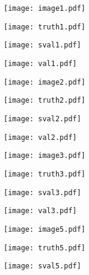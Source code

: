 \documentclass[journal]{IEEEtran}
\begin{document}
\begin{figure*}
\centering
\begin{minipage}{1.6in}
\texttt{[image: image1.pdf]}
\end{minipage}
\begin{minipage}{1.6in}
\texttt{[image: truth1.pdf]}
\end{minipage}
\begin{minipage}{1.6in}
\texttt{[image: sval1.pdf]}
\end{minipage}
\vspace{0.3em}
\begin{minipage}{1.6in}
\texttt{[image: val1.pdf]}
\end{minipage}
\vspace{0.3em}
\begin{minipage}{1.6in}
\texttt{[image: image2.pdf]}
\end{minipage}
\begin{minipage}{1.6in}
\texttt{[image: truth2.pdf]}
\end{minipage}
\begin{minipage}{1.6in}
\texttt{[image: sval2.pdf]}
\end{minipage}
\begin{minipage}{1.6in}
\texttt{[image: val2.pdf]}
\end{minipage}
\vspace{0.3em}
\begin{minipage}{1.6in}
\texttt{[image: image3.pdf]}
\end{minipage}
\begin{minipage}{1.6in}
\texttt{[image: truth3.pdf]}
\end{minipage}
\begin{minipage}{1.6in}
\texttt{[image: sval3.pdf]}
\end{minipage}
\begin{minipage}{1.6in}
\texttt{[image: val3.pdf]}
\end{minipage}
\vspace{0.3em}
\begin{minipage}{1.6in}
\texttt{[image: image5.pdf]}
\end{minipage}
\begin{minipage}{1.6in}
\texttt{[image: truth5.pdf]}
\end{minipage}
\begin{minipage}{1.6in}
\texttt{[image: sval5.pdf]}

\end{minipage}
\end{figure*}
\end{document}
